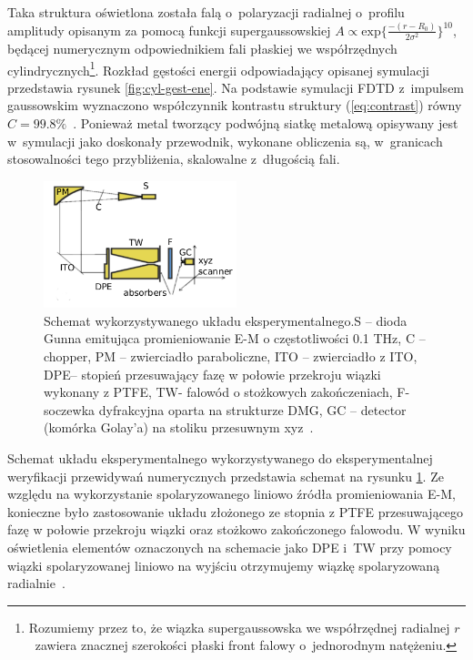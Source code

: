 Taka struktura oświetlona została falą o~polaryzacji radialnej o~profilu amplitudy opisanym za pomocą funkcji supergaussowskiej $A \propto \textrm{exp}\{\frac{-(r-R_0)}{2\sigma^2}\}^{10}$, będącej numerycznym odpowiednikiem fali płaskiej we współrzędnych cylindrycznych\footnote{Rozumiemy przez to, że wiązka supergaussowska we współrzędnej radialnej $r$~zawiera znacznej szerokości płaski front falowy o~jednorodnym natężeniu.}. Rozkład gęstości energii odpowiadający opisanej symulacji przedstawia rysunek \ref{fig:cyl-gest-ene}. Na podstawie symulacji FDTD z~impulsem gaussowskim wyznaczono współczynnik kontrastu struktury (\ref{eq:contrast}) równy $C=99.8\%$~\cite{Yavorskiy:14}. Ponieważ metal tworzący podwójną siatkę metalową opisywany jest w~symulacji jako doskonały przewodnik, wykonane obliczenia są, w~granicach stosowalności tego przybliżenia, skalowalne z~długością fali.

\begin{figure}
	\centering
	\includegraphics[width=0.5\textwidth]{images/thz/exp-express-schem.png}
	\caption{Schemat wykorzystywanego układu eksperymentalnego.S – dioda Gunna emitująca promieniowanie E-M o częstotliwości 0.1 THz, C – chopper, PM – zwierciadło paraboliczne, ITO – zwierciadło z ITO, DPE– stopień przesuwający fazę w połowie przekroju wiązki wykonany z PTFE, TW- falowód o stożkowych zakończeniach, F- soczewka dyfrakcyjna oparta na strukturze DMG, GC – detector (komórka Golay'a) na stoliku przesuwnym xyz~\cite{Yavorskiy:14}.}
	\label{fig:opt-exp-schem}
\end{figure}

Schemat układu eksperymentalnego wykorzystywanego do eksperymentalnej weryfikacji przewidywań numerycznych przedstawia schemat na rysunku \ref{fig:opt-exp-schem}. Ze względu na wykorzystanie spolaryzowanego liniowo źródła promieniowania E-M, konieczne było zastosowanie układu złożonego ze stopnia z PTFE przesuwającego fazę w połowie przekroju wiązki oraz stożkowo zakończonego falowodu. W wyniku oświetlenia elementów oznaczonych na schemacie jako DPE i~TW przy pomocy wiązki spolaryzowanej liniowo na wyjściu otrzymujemy wiązkę spolaryzowaną radialnie~\cite{grosjean2008linear}.

